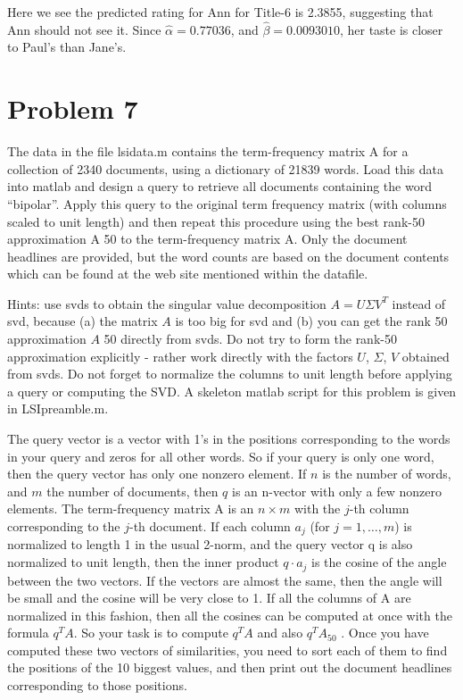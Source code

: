 \documentclass[12pt,oneside,a4paper]{article}
\newcommand{\problem}[1]
{
    \clearpage
    \section*{Problem {#1}}
}
\begin{document}
Here we see the predicted rating for Ann for Title-6 is 2.3855, suggesting that Ann should not see it. Since $\hat{\alpha} = 0.77036$, and $\hat{\beta} = 0.0093010$, her taste is closer to Paul's than Jane's.

\problem{7}
The data in the file lsidata.m contains the term-frequency matrix A for a collection of 2340 documents, using a dictionary of 21839 words. Load this data into matlab and design a query to retrieve all documents containing the word ``bipolar''. Apply this query to the original term frequency matrix (with columns scaled to unit length) and then repeat this procedure using the best rank-50 approximation A 50 to the term-frequency matrix A. Only the document headlines are provided, but the word counts are based on the document contents which can be found at the web site mentioned within the datafile.

Hints: use svds to obtain the singular value decomposition $A = U\Sigma V^{T}$ instead of svd, because (a) the matrix $A$ is too big for svd and (b) you can get the rank 50 approximation $A$ 50 directly from svds. Do not try to form the rank-50 approximation explicitly - rather work directly with the factors $U$, $\Sigma$, $V$ obtained from svds. Do not forget to normalize the columns to unit length before applying a query or computing the SVD. A skeleton matlab script for this problem is given in LSIpreamble.m.

The query vector is a vector with 1's in the positions corresponding to the words in your query and zeros for all other words. So if your query is only one word, then the query vector has only one nonzero element. If $n$ is the number of words, and $m$ the number of documents, then $q$ is an n-vector with only a few nonzero elements. The term-frequency matrix A is an $n \times m$ with the $j$-th column corresponding to the $j$-th document. If each column $a_j$ (for $j = 1, \dots, m$) is normalized to length 1 in the usual 2-norm, and the query vector q is also normalized to unit length, then the inner product $q \cdot a_{j}$ is the cosine of the angle between the two vectors. If the vectors are almost the same, then the angle will be small and the cosine will be very close to 1. If all the columns of A are normalized in this fashion, then all the cosines can be computed at once with the formula $q^{T}A$. So your task is to compute $q^{T}A$ and also $q^{T}A_{50}$ . Once you have computed these two vectors of similarities, you need to sort each of them to find the positions of the 10 biggest values, and then print out the document headlines corresponding to those positions.
\end{document}
